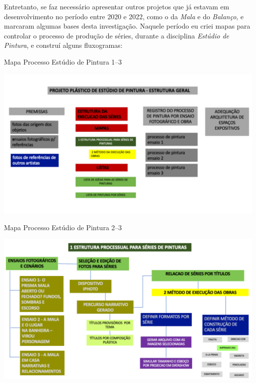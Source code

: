 Entretanto, se faz necessário apresentar outros projetos que já estavam
em desenvolvimento no período entre 2020 e 2022, como o da \emph{Mala}
e do \emph{Balanço}, e marcaram algumas bases desta investigação.
Naquele período eu criei mapas para controlar o processo de produção de
séries, durante a disciplina \emph{Estúdio de Pintura}, e construí
alguns fluxogramas:

\clearpage

\begin{quadro}
  \centering
  \caption{Mapa Processo Estúdio de Pintura 1--3}
\includegraphics[width=\linewidth]{figuras/quadros/mapa-processo-estudio-pintura1.pdf}
\end{quadro}

\vfill

\begin{quadro}
  \centering
  \caption{Mapa Processo Estúdio de Pintura 2--3}
\includegraphics[width=\linewidth]{figuras/quadros/mapa-processo-estudio-pintura2.pdf}
\end{quadro}
\clearpage

